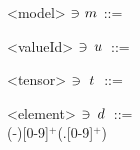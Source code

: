 \begin{minipage}[t]{\textwidth}
	\setlength{\grammarindent}{7em}
	\begin{grammar}
	<model> $\ni \makebox[1em][c]{$\modelVar$}$ ::= \missing

	<valueId> $\ni \makebox[1em][c]{$\onnxNameVar$}$ ::= \missing

	<tensor> $\ni \makebox[1em][c]{$\tensorVar$}$ ::= \missing

	<element> $\ni \makebox[1em][c]{$\elementVar$}$ ::= \\
		\mbox{(-)[0-9]$^+$(.[0-9]$^+$)}
	\end{grammar}
\end{minipage}
